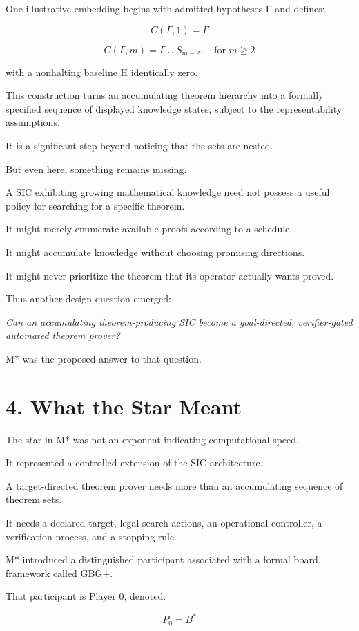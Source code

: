 \documentclass[11pt,letterpaper]{article}
\begin{document}
One illustrative embedding begins with admitted hypotheses Γ and defines:

\[C(\Gamma,1)=\Gamma\]

\[C(\Gamma,m)=\Gamma\cup S_{m-2},\quad\text{for }m\ge2\]

with a nonhalting baseline H identically zero.

This construction turns an accumulating theorem hierarchy into a formally specified sequence of displayed knowledge states, subject to the representability assumptions.

It is a significant step beyond noticing that the sets are nested.

But even here, something remains missing.

A SIC exhibiting growing mathematical knowledge need not possess a useful policy for searching for a specific theorem.

It might merely enumerate available proofs according to a schedule.

It might accumulate knowledge without choosing promising directions.

It might never prioritize the theorem that its operator actually wants proved.

Thus another design question emerged:

\emph{Can an accumulating theorem-producing SIC become a goal-directed, verifier-gated automated theorem prover?}

M* was the proposed answer to that question.

\section{4. What the Star Meant}\label{what-the-star-meant}

The star in M* was not an exponent indicating computational speed.

It represented a controlled extension of the SIC architecture.

A target-directed theorem prover needs more than an accumulating sequence of theorem sets.

It needs a declared target, legal search actions, an operational controller, a verification process, and a stopping rule.

M* introduced a distinguished participant associated with a formal board framework called GBG+.

That participant is Player 0, denoted:

\[P_0=B^{*}\]
\end{document}
